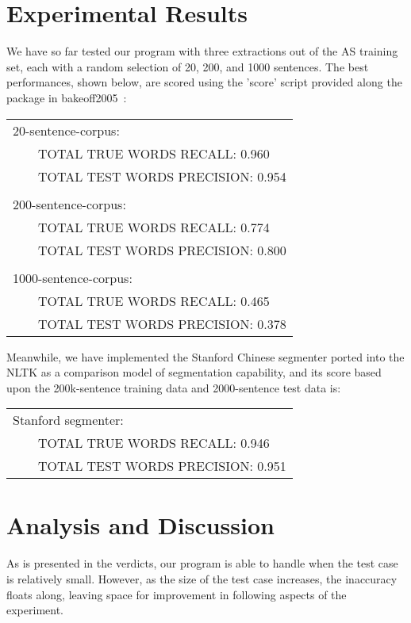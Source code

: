 \documentclass[UTF8,11pt]{article}
\begin{document}
\section{Experimental Results}
\noindent We have so far tested our program with three extractions out of the AS training set, each with a random selection of 20, 200, and 1000 sentences. The best performances, shown below, are scored using the 'score' script provided along the package in bakeoff2005~\cite{bakeoff_data}:
\begin{center}
\begin{tabular}{ll}
20-sentence-corpus: & \\
\multicolumn{2}{l}{~~~~TOTAL TRUE WORDS RECALL: 0.960} \\
\multicolumn{2}{l}{~~~~TOTAL TEST WORDS PRECISION: 0.954} \\
\\
200-sentence-corpus: & \\
\multicolumn{2}{l}{~~~~TOTAL TRUE WORDS RECALL: 0.774} \\
\multicolumn{2}{l}{~~~~TOTAL TEST WORDS PRECISION: 0.800} \\
\\
1000-sentence-corpus: & \\
\multicolumn{2}{l}{~~~~TOTAL TRUE WORDS RECALL: 0.465} \\
\multicolumn{2}{l}{~~~~TOTAL TEST WORDS PRECISION: 0.378} \\
\end{tabular}
\end{center}

Meanwhile, we have implemented the Stanford Chinese segmenter ported into the NLTK as a comparison model of segmentation capability, and its score based upon the 200k-sentence training data and 2000-sentence test data is:
\begin{center}
\begin{tabular}{ll}
Stanford segmenter: & \\
\multicolumn{2}{l}{~~~~TOTAL TRUE WORDS RECALL: 0.946} \\
\multicolumn{2}{l}{~~~~TOTAL TEST WORDS PRECISION: 0.951} \\
\end{tabular}
\end{center}

\section{Analysis and Discussion}
\noindent As is presented in the verdicts, our program is able to handle when the test case is relatively small. However, as the size of the test case increases, the inaccuracy floats along, leaving space for improvement in following aspects of the experiment.
\end{document}
